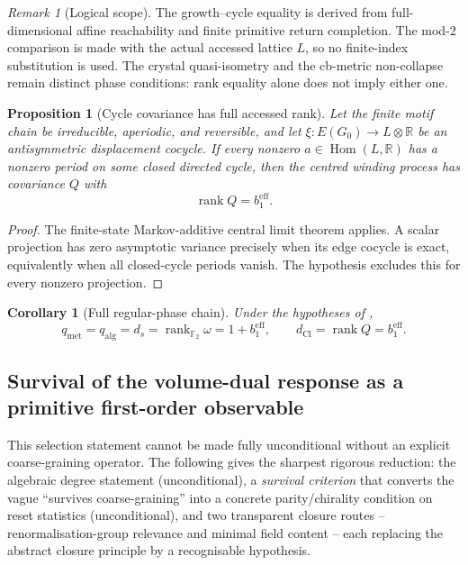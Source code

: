 \documentclass[11pt]{article}
\newtheorem{proposition}[theorem]{Proposition}
\newtheorem{corollary}[theorem]{Corollary}
\theoremstyle{definition}
\theoremstyle{remark}
\newtheorem{remark}[theorem]{Remark}
\newcommand{\R}{\mathbb{R}}
\newcommand{\F}{\mathbb{F}}
\newcommand{\qalg}{q_{\mathrm{alg}}}
\newcommand{\qmet}{q_{\mathrm{met}}}
\newcommand{\dCl}{d_{\mathrm{Cl}}}
\newcommand{\ds}{d_s}
\newcommand{\beff}{b_1^{\mathrm{eff}}}
\newcommand{\Go}{G_0}
\newcommand{\Lat}{L}
\newcommand{\rank}{\operatorname{rank}}
\newcommand{\Hom}{\operatorname{Hom}}
\begin{document}
\begin{remark}[Logical scope]
\label{rem:dimension-coincidence-scope}
The growth--cycle equality is derived from full-dimensional affine reachability
and finite primitive return completion.  The mod-\(2\) comparison is made with
the actual accessed lattice \(\Lat\), so no finite-index substitution is used.
The crystal quasi-isometry and the cb-metric non-collapse remain distinct phase
conditions: rank equality alone does not imply either one.
\end{remark}

\begin{proposition}[Cycle covariance has full accessed rank]
\label{prop:cycle-covariance-rank}
Let the finite motif chain be irreducible, aperiodic, and reversible, and let
\(\xi:E(\Go)\to\Lat\otimes\R\) be an antisymmetric displacement cocycle.  If every
nonzero \(a\in\Hom(\Lat,\R)\) has a nonzero period on some closed directed cycle,
then the centred winding process has covariance \(Q\) with
\[
 \boxed{\rank Q=\beff.}
\]
\end{proposition}

\begin{proof}
The finite-state Markov-additive central limit theorem applies.  A scalar
projection has zero asymptotic variance precisely when its edge cocycle is
exact, equivalently when all closed-cycle periods vanish.  The hypothesis
excludes this for every nonzero projection.
\end{proof}

\begin{corollary}[Full regular-phase chain]
\label{cor:full-dimension-chain}
Under the hypotheses of
,
\[
 \boxed{
 \qmet=\qalg=\ds=\rank_{\F_2}\omega=1+\beff,
 \qquad
 \dCl=\rank Q=\beff.
 }
\]
\end{corollary}


\subsection{Survival of the volume-dual response as a primitive first-order observable}
\label{sec:cxi}

This selection statement cannot be made fully unconditional without an
explicit coarse-graining operator.  The following gives the
sharpest rigorous reduction: the algebraic degree statement (unconditional), a
\emph{survival criterion} that converts the vague ``survives coarse-graining'' into
a concrete parity/chirality condition on reset statistics (unconditional), and two
transparent closure routes -- renormalisation-group relevance and minimal field
content -- each replacing the abstract closure principle by a recognisable
hypothesis.
\end{document}
